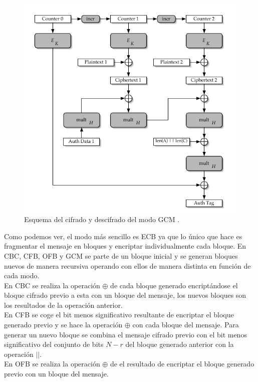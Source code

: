 \begin{itemize}
\begin{figure}[htb]
			\centering
			\includegraphics[scale=0.4]{imagenes/cgc.png} 
			\caption{Esquema del cifrado y descifrado del modo GCM \cite{gcm}.}
			\label{esquemaofb}
		\end{figure}
\end{itemize}
Como podemos ver, el modo más sencillo es ECB ya que lo único que hace es fragmentar el mensaje en bloques y encriptar individualmente cada bloque. En CBC, CFB, OFB y GCM se parte de un bloque inicial y se generan bloques nuevos de manera recursiva operando con ellos de manera distinta en función de cada modo.\\ 
En CBC se realiza la operación $\oplus$ de cada bloque generado encriptándose el bloque cifrado previo a esta con un bloque del mensaje, los nuevos bloques son los resultados de la operación anterior.\\
En CFB se coge el bit menos significativo resultante de encriptar el bloque generado previo y se hace la operación $\oplus$ con cada bloque del mensaje. Para generar un nuevo bloque se combina el mensaje cifrado previo con el bit menos significativo del conjunto de bits $N-r$ del bloque generado anterior con la operación $||$.\\
En OFB se realiza la operación $\oplus$ de el resultado de encriptar el bloque generado previo con un bloque del mensaje.\\
